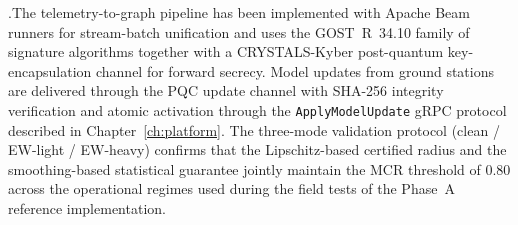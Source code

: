 .\quad The telemetry-to-graph pipeline has been
implemented with Apache Beam runners for stream-batch unification
and uses the GOST~R~34.10 family of signature algorithms together
with a CRYSTALS-Kyber post-quantum key-encapsulation channel for
forward secrecy. Model updates from ground stations are delivered
through the PQC update channel with SHA-256 integrity verification
and atomic activation through the \texttt{ApplyModelUpdate} gRPC
protocol described in Chapter~\ref{ch:platform}. The three-mode
validation protocol (clean / EW-light / EW-heavy) confirms that the
Lipschitz-based certified radius and the smoothing-based statistical
guarantee jointly maintain the MCR threshold of 0.80 across the
operational regimes used during the field tests of the Phase~A
reference implementation.
